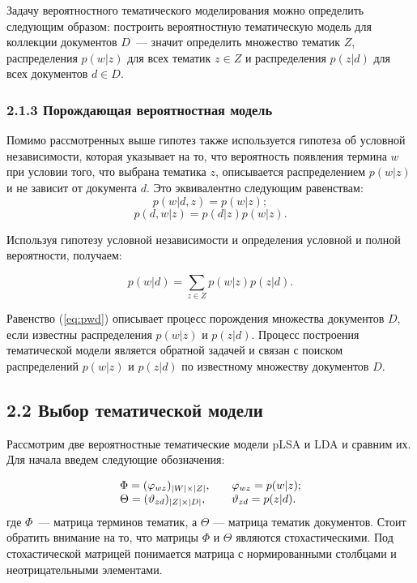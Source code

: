 \documentclass[a4paper]{report}
\begin{document}
	Задачу вероятностного тематического моделирования можно определить следующим образом: построить вероятностную тематическую модель для коллекции документов $D$~--- значит определить множество тематик $Z$, распределения $p(w|z)$ для всех тематик $z \in Z$ и распределения $p(z|d)$ для всех документов $d \in D$.
	
	\subsubsection{2.1.3 Порождающая вероятностная модель}

	Помимо рассмотренных выше гипотез также используется гипотеза об условной независимости, которая указывает на то, что вероятность появления термина $w$ при	условии того, что выбрана тематика $z$, описывается распределением $p(w|z)$ и не зависит от документа $d$. Это эквивалентно следующим равенствам:
			$$ p(w|d,z) = p(w|z); $$
			$$ p(d,w|z) = p(d|z)p(w|z).$$

	Используя гипотезу условной независимости и определения условной и полной вероятности, получаем:
	
	\begin{equation}
		p(w|d) = \sum_{z \in Z} p(w|z)p(z|d).
	\label{eq:pwd}
	\end{equation}
	
	Равенство (\ref{eq:pwd}) описывает процесс порождения множества документов $D$, если известны распределения $p(w|z)$ и  $p(z|d)$. Процесс построения тематической модели является обратной задачей и связан с поиском распределений $p(w|z)$ и  $p(z|d)$ по известному множеству документов $D$.
	
	\subsection{2.2 Выбор тематической модели}
	
	Рассмотрим две вероятностные тематические модели pLSA и LDA и сравним их. 
	Для начала введем следующие обозначения:
	
	$$
	\begin{array}{l l}
			
	\Phi = (\varphi_{wz})_{|W| \times |Z|}, & \quad \varphi_{wz} = p(w|z); \\
			\Theta = (\vartheta_{zd})_{|Z| \times |D|}, &  \quad
				\vartheta_{zd} = p(z|d). 
		\end{array}$$
	где $\Phi$~--- матрица терминов тематик, а $\Theta$ --- матрица тематик документов. Стоит обратить внимание на то, что матрицы $\Phi$ и $\Theta$ являются стохастическими. Под стохастической матрицей понимается матрица с нормированными столбцами и неотрицательными элементами.
	
\end{document}
